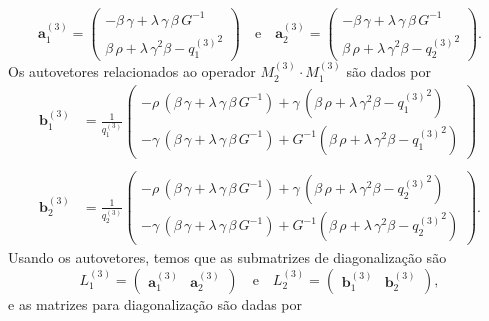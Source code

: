 \begin{equation*}
\mathbf{a}^{(3)}_1
=
\begin{pmatrix}
-\beta\,\gamma+\lambda\,\gamma\,\beta\,G^{-1}\\
\beta\,\rho+\lambda\,\gamma^2\beta-{q^{(3)}_1}^2
\end{pmatrix}
\quad\text{e}\quad
\mathbf{a}^{(3)}_2
=
\begin{pmatrix}
-\beta\,\gamma+\lambda\,\gamma\,\beta\,G^{-1}\\
\beta\,\rho+\lambda\,\gamma^2\beta-{q^{(3)}_2}^2
\end{pmatrix}.
\end{equation*}
Os autovetores relacionados ao operador $M^{(3)}_2\cdot M^{(3)}_1$ s\~ao dados por
\begin{align*}
\mathbf{b}^{(3)}_1
&=
\frac{1}{{q^{(3)}_1}}
\begin{pmatrix}
-\rho\,(\beta\,\gamma+\lambda\,\gamma\,\beta\,G^{-1})+\gamma\,(\beta\,\rho+\lambda\,\gamma^2\beta-{q^{(3)}_1}^2)\\
-\gamma\,(\beta\,\gamma+\lambda\,\gamma\,\beta\,G^{-1})+G^{-1}(\beta\,\rho+\lambda\,\gamma^2\beta-{q^{(3)}_1}^2)
\end{pmatrix}\\\\
\mathbf{b}^{(3)}_2
&=
\frac{1}{{q^{(3)}_2}}
\begin{pmatrix}
-\rho\,(\beta\,\gamma+\lambda\,\gamma\,\beta\,G^{-1})+\gamma\,(\beta\,\rho+\lambda\,\gamma^2\beta-{q^{(3)}_2}^2)\\
-\gamma\,(\beta\,\gamma+\lambda\,\gamma\,\beta\,G^{-1})+G^{-1}(\beta\,\rho+\lambda\,\gamma^2\beta-{q^{(3)}_2}^2)
\end{pmatrix}.
\end{align*}
Usando os autovetores, temos que as submatrizes de diagonaliza\c{c}\~ao s\~ao
\begin{equation*}
L^{(3)}_1=
\begin{pmatrix}
\mathbf{a}^{(3)}_1&\mathbf{a}^{(3)}_2
\end{pmatrix}
\quad\text{e}\quad
L^{(3)}_2=
\begin{pmatrix}
\mathbf{b}^{(3)}_1&\mathbf{b}^{(3)}_2
\end{pmatrix},
\end{equation*}
e as matrizes para diagonaliza\c{c}\~ao s\~ao dadas por
